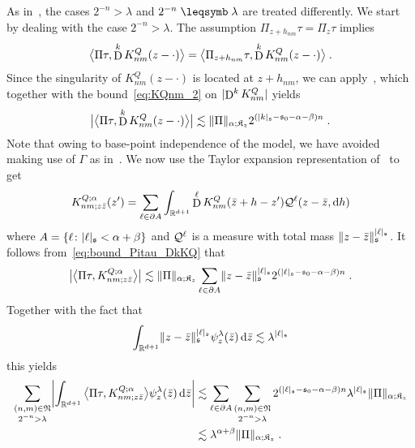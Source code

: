 \documentclass[reqno,11pt]{article}
\def\fraks{\mathfrak{s}}
\def\fraK{\mathfrak{K}}
\def\abss#1{\abs{#1}_\mathfrak{s}}
\DeclareMathOperator{\D}{D}            %
\newcommand{\setnm}{\mathfrak{N}}
\newcommand{\sumnmarg}[1]{\sum_{\substack{(n,m)\in\setnm\\#1}}}
\begin{document}
As in~\cite[Lem.~5.19]{Hairer2014}, the cases $2^{-n} > \lambda$ and
$2^{-n}\leqs\lambda$ are treated differently. We start by dealing with the case
$2^{-n} > \lambda$. 
The assumption $\Pi_{z+h_{nm}}\tau = \Pi_z\tau$ implies
\begin{equation}
 \bigpscal{\Pi\tau}{\D^k K^Q_{nm}(z-\cdot)}
 =  \bigpscal{\Pi_{z+h_{nm}}\tau}{\D^k K^Q_{nm}(z-\cdot)}\;.
\end{equation} 
Since the singularity of $K^Q_{nm}(z-\cdot)$ is located at 
$z+h_{nm}$, we can apply~\cite[Rem.~2.21]{Hairer2014}, which together with the
bound~\eqref{eq:KQnm_2} on $\abs{\D^k K^Q_{nm}}$ yields 
\begin{equation}
\label{eq:bound_Pitau_DkKQ} 
 \bigabs{\bigpscal{\Pi\tau}{\D^k K^Q_{nm}(z-\cdot)}}
 \lesssim \norm{\Pi}_{\alpha;\fraK_z} 2^{(\abss{k}-\fraks_0-\alpha-\beta)n}\;.
\end{equation} 
Note that owing to base-point independence of the model, we have avoided making
use of $\Gamma$ as in~\cite[Lem.~5.18]{Hairer2014}. We now use the Taylor
expansion representation of~\cite[Appendix~A]{Hairer2014} to get 
\begin{equation}
\label{eq:KQalpha_int} 
  K^{Q;\alpha}_{nm;z\bar z}(z') 
 = \sum_{\ell\in\partial A} \int_{\R^{d+1}} \D^\ell K^Q_{nm}(\bar
z+h-z')\cQ^\ell(z-\bar z,\6h)
\end{equation} 
where $A = \setsuch{\ell}{\abss{\ell} < \alpha+\beta}$ and ${\mathcal Q}^\ell$ is a
measure with total mass $\norm{z-\bar z}_\fraks^{\abss{\ell}}$. 
It follows from~\eqref{eq:bound_Pitau_DkKQ} that 
\begin{equation}
 \bigabs{\bigpscal{\Pi\tau}{K^{Q;\alpha}_{nm;z\bar z}}} 
 \lesssim \norm{\Pi}_{\alpha;\fraK_z} 
 \sum_{\ell\in\partial A} \norm{z-\bar z}_\fraks^{\abss{\ell}} 
 2^{(\abss{\ell}-\fraks_0-\alpha-\beta)n}\;.
\end{equation} 
Together with the fact that 
\begin{equation}
\label{eq:bound_integral_power} 
 \int_{\R^{d+1}} \norm{z-\bar z}^{\abs{\ell}_\fraks}_\fraks
\psi^\lambda_z(\bar z)\6\bar z \lesssim \lambda^{\abs{\ell}_\fraks}
\end{equation}
this yields 
\begin{align}
\nonumber
 \sumnmarg{2^{-n} > \lambda}  
 \biggabs{\int_{\R^{d+1}}  \bigpscal{\Pi\tau}{K^{Q;\alpha}_{nm;z\bar
z}} \psi^\lambda_z(\bar z) \6\bar z}
& \lesssim \sum_{\ell\in\partial A} \sumnmarg{2^{-n} > \lambda} 
2^{(\abss{\ell}-\fraks_0-\alpha-\beta)n} \lambda^{\abs{\ell}_\fraks}
\norm{\Pi}_{\alpha;\fraK_z} \\
& \lesssim \lambda^{\alpha+\beta} \norm{\Pi}_{\alpha;\fraK_z}\;.
\end{align} 
\end{document}
